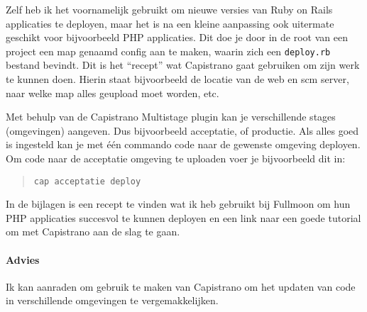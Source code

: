 Zelf heb ik het voornamelijk gebruikt om nieuwe versies van Ruby on Rails applicaties te deployen, maar het is na een kleine aanpassing ook uitermate geschikt voor bijvoorbeeld PHP applicaties. Dit doe je door in de root van een project een map genaamd config aan te maken, waarin zich een \texttt{deploy.rb} bestand bevindt. Dit is het ``recept'' wat Capistrano gaat gebruiken om zijn werk te kunnen doen. Hierin staat bijvoorbeeld de locatie van de web en {\sc scm} server, naar welke map alles geupload moet worden, etc.

Met behulp van de Capistrano Multistage plugin\cite{capistranomultistage} kan je verschillende stages (omgevingen) aangeven. Dus bijvoorbeeld acceptatie, of productie. Als alles goed is ingesteld kan je met één commando code naar de gewenste omgeving deployen. Om code naar de acceptatie omgeving te uploaden voer je bijvoorbeeld dit in:

\begin{quote}
  \texttt{cap acceptatie deploy}
\end{quote}

In de bijlagen is een recept te vinden wat ik heb gebruikt bij Fullmoon om hun PHP applicaties succesvol te kunnen deployen en een link naar een goede tutorial om met Capistrano aan de slag te gaan.

\paragraph{Advies} Ik kan aanraden om gebruik te maken van Capistrano om het updaten van code in verschillende omgevingen te vergemakkelijken.
